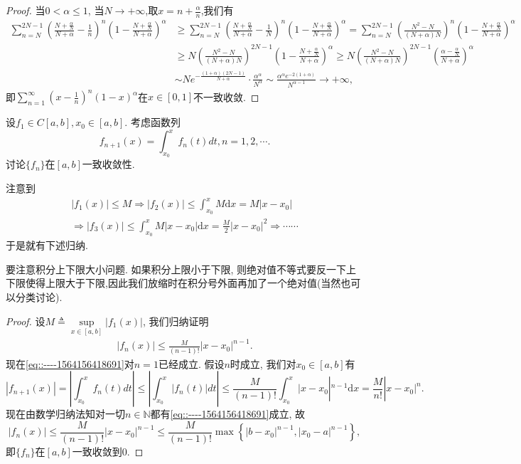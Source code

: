 \documentclass[../../main.tex]{subfiles}
\begin{document}
\begin{proof}
当$0<\alpha\leqslant1$, 当$N\to+\infty$,取$x=n+\frac{\alpha}{n}$,我们有
$$
\begin{aligned}
\sum_{n=N}^{2N-1}{\left( \frac{N+\frac{\alpha}{N}}{N+\alpha}-\frac{1}{n} \right) ^n\left( 1-\frac{N+\frac{\alpha}{N}}{N+\alpha} \right) ^{\alpha}}&\geqslant \sum_{n=N}^{2N-1}{\left( \frac{N+\frac{\alpha}{N}}{N+\alpha}-\frac{1}{N} \right) ^n\left( 1-\frac{N+\frac{\alpha}{N}}{N+\alpha} \right) ^{\alpha}}
=\sum_{n=N}^{2N-1}{\left( \frac{N^2-N}{(N+\alpha )N} \right) ^n\left( 1-\frac{N+\frac{\alpha}{N}}{N+\alpha} \right) ^{\alpha}}
\\
&\geqslant N\left( \frac{N^2-N}{(N+\alpha )N} \right) ^{2N-1}\left( 1-\frac{N+\frac{\alpha}{N}}{N+\alpha} \right) ^{\alpha}
\geqslant N\left( \frac{N^2-N}{(N+\alpha )N} \right) ^{2N-1}\left( \frac{\alpha -\frac{\alpha}{N}}{N+\alpha} \right) ^{\alpha}
\\
&\sim Ne^{-\frac{\left( 1+\alpha \right) \left( 2N-1 \right)}{N+\alpha}}\cdot \frac{\alpha ^{\alpha}}{N^{\alpha}}\sim \frac{\alpha ^{\alpha}e^{-2\left( 1+\alpha \right)}}{N^{\alpha -1}}\rightarrow +\infty ,
\end{aligned}
$$
即$\sum\limits_{n=1}^{\infty}\left(x-\frac{1}{n}\right)^n(1-x)^\alpha$在$x\in[0,1]$不一致收敛.
\end{proof}

\begin{example}
设$f_1\in C[a,b],x_0\in[a,b]$. 考虑函数列
$$
f_{n+1}(x)=\int_{x_0}^{x}f_n(t)dt,n=1,2,\cdots.
$$
讨论$\{f_n\}$在$[a,b]$一致收敛性.
\end{example}
\begin{note}
注意到
\begin{gather*}
\left| f_1\left( x \right) \right|\leqslant M\Rightarrow \left| f_2\left( x \right) \right|\leqslant \int_{x_0}^x{M\mathrm{d}x}=M\left| x-x_0 \right|
\\
\Rightarrow \left| f_3\left( x \right) \right|\leqslant \int_{x_0}^x{M\left| x-x_0 \right|\mathrm{d}x}=\frac{M}{2}\left| x-x_0 \right|^2\Rightarrow \cdots \cdots 
\end{gather*}
于是就有下述归纳.
\end{note}
\begin{remark}
要注意积分上下限大小问题. 如果积分上限小于下限, 则绝对值不等式要反一下上下限使得上限大于下限,因此我们放缩时在积分号外面再加了一个绝对值(当然也可以分类讨论).
\end{remark}
\begin{proof}
设$M\triangleq\sup\limits_{x\in[a,b]}|f_1(x)|$, 我们归纳证明
\begin{align}
|f_n(x)|\leqslant\frac{M}{(n-1)!}|x-x_0|^{n-1}\label{eq::----1564156418691}.
\end{align}
现在\eqref{eq::----1564156418691}对$n=1$已经成立. 假设$n$时成立, 我们对$x_0\in [a,b]$有
$$
|f_{n+1}(x)|=\left| \int_{x_0}^x{f_n(t)dt} \right|\leqslant \left| \int_{x_0}^x{\left| f_n(t) \right|dt} \right|\leqslant \frac{M}{(n-1)!}\int_{x_0}^x{|x}-x_0|^{n-1}\mathrm{d}x=\frac{M}{n!}|x-x_0|^n.
$$
现在由数学归纳法知对一切$n\in\mathbb{N}$都有\eqref{eq::----1564156418691}成立, 故
$$
|f_n(x)|\leqslant\frac{M}{(n-1)!}|x-x_0|^{n-1}\leqslant\frac{M}{(n-1)!}\max\left\{|b-x_0|^{n-1},|x_0-a|^{n-1}\right\},
$$
即$\{f_n\}$在$[a,b]$一致收敛到$0$.
\end{proof}
\end{document}
